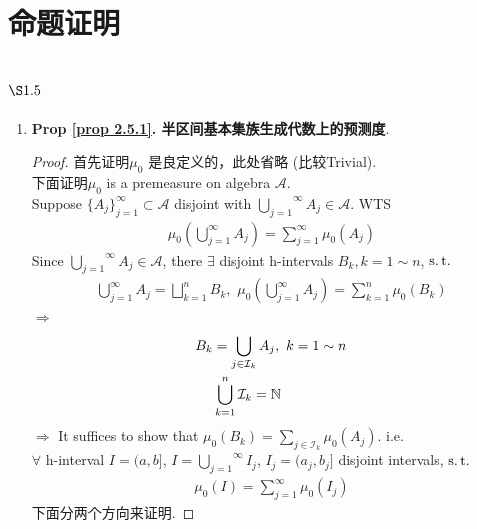 \ifx\allfiles\undefined


	\else
	\fi
\appendix

\chapter{命题证明}
\setcounter{section}{4}

\section{$\S 1.5$}
	\begin{enumerate}
		\item \textbf{Prop \ref{prop 2.5.1}. 半区间基本集族生成代数上的预测度}. \\
		\begin{proof}
			首先证明$\mu_0$ 是良定义的，此处省略 (比较Trivial). \\
			下面证明$\mu_0$ is a premeasure on algebra $\mathcal{A}$. \\
			Suppose $\{ A_j \}_{j = 1}^{\infty} \subset \mathcal{A}$ disjoint with $\overset{\infty}{\underset{j = 1}{\bigcup}}{A_j} \in \mathcal{A}$. WTS
			\begin{align}
				\mu_0(\bigcup_{j = 1}^{\infty}{A_j}) = \sum_{j = 1}^{\infty}{\mu_0(A_j)}
			\end{align}
			Since $\overset{\infty}{\underset{j = 1}{\bigcup}}{A_j} \in \mathcal{A}$, there $\exists$ disjoint h-intervals $B_k , k = 1 \sim n$, $\operatorname{s.t.}$
			\begin{align}
				\bigcup_{j = 1}^{\infty}{A_j} = \bigsqcup_{k = 1}^{n}{B_k} , \,\, \mu_0(\bigcup_{j = 1}^{\infty}{A_j}) = \sum_{k = 1}^{n}{\mu_0(B_k)}
			\end{align}
			$\Rightarrow$
			\begin{align}
				B_k &= \bigcup_{j \in \mathcal{I}_k}{A_j} , \,\, k = 1 \sim n \\
				&\bigcup_{k = 1}^{n}{\mathcal{I}_k} = \mathbb{N}
			\end{align}
			$\Rightarrow$ It suffices to show that $\mu_0(B_k) = \underset{j \in \mathcal{I}_k}{\sum}{\mu_0(A_j)}$. i.e. \\
			$\forall$ h-interval $I = (a , b]$, $I = \overset{\infty}{\underset{j = 1}{\bigcup}}{I_j}$, $I_j = (a_j , b_j]$ disjoint intervals, $\operatorname{s.t.}$
			\begin{align}
				\mu_0(I) = \sum_{j = 1}^{\infty}{\mu_0(I_j)}
			\end{align}
			下面分两个方向来证明.
			

\end{proof}
\end{enumerate}
